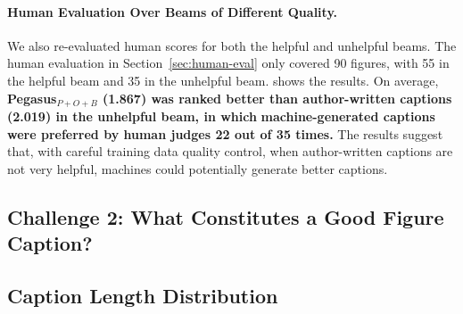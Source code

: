 

\paragraph{Human Evaluation Over Beams of Different Quality.}
We also re-evaluated human scores for both the helpful and unhelpful beams.
The human evaluation in Section~\ref{sec:human-eval} only covered 90 figures, with 55 in the helpful beam and 35 in the unhelpful beam.
 shows the results.
On average,
\textbf{Pegasus$_{P+O+B}$ (1.867) was ranked better than author-written captions (2.019) in the unhelpful beam, in which}
\textbf{machine-generated captions were preferred by human judges 22 out of 35 times.}
The results suggest that, with careful training data quality control, when author-written captions are not very helpful, machines could potentially generate better captions.







\subsection{Challenge 2: What Constitutes a Good Figure Caption?\label{sec:quality-annotation}}






\subsection{Caption Length Distribution}

